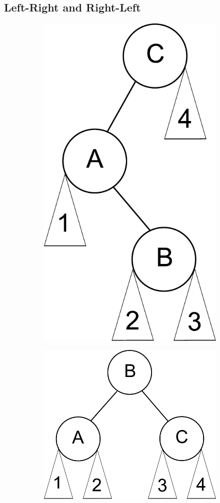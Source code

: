 \subsection*{Left-Right and Right-Left}
\begin{figure}[h]
\centering
\begin{subfigure}[b]{.49\textwidth}
    \centering
    \includegraphics[width=.75\textwidth]{left_right.pdf}
\end{subfigure}
\begin{subfigure}[b]{.49\textwidth}
    \centering
    \includegraphics[width=.75\textwidth]{balanced.pdf}
\end{subfigure}
\end{figure}

